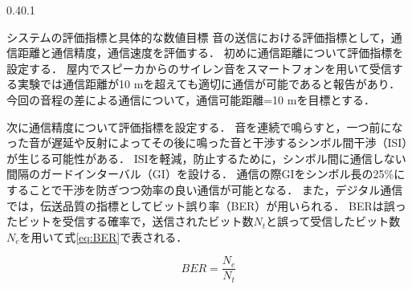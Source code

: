 \documentclass[a4j,11pt,dvipdfmx]{jsarticle}
\makeatletter
\renewcommand{\section}{%
    \@startsection{section}{1}{\z@}%
    {0.4\Cvs}{0.1\Cvs}%
    {\normalfont\headfont\raggedright}}
\makeatother
\begin{document}
\section{システムの評価指標と具体的な数値目標}\label{sec:evaluation}
音の送信における評価指標として，通信距離と通信精度，通信速度を評価する．
初めに通信距離について評価指標を設定する．
屋内でスピーカからのサイレン音をスマートフォンを用いて受信する実験では通信距離が10 mを超えても適切に通信が可能であると報告があり\cite{ref:tone}\cite{ref:tone2}．今回の音程の差による通信について，通信可能距離=10 mを目標とする．
\par
次に通信精度について評価指標を設定する．
音を連続で鳴らすと，一つ前になった音が遅延や反射によってその後に鳴った音と干渉するシンボル間干渉（ISI）が生じる可能性がある．
ISIを軽減，防止するために，シンボル間に通信しない間隔のガードインターバル（GI）を設ける．
通信の際GIをシンボル長の25\%にすることで干渉を防ぎつつ効率の良い通信が可能となる\cite{ref:GI}．
また，デジタル通信では，伝送品質の指標としてビット誤り率（BER）が用いられる\cite{ref:BER}．
BERは誤ったビットを受信する確率で，送信されたビット数$N_t$と誤って受信したビット数$N_e$を用いて式\ref{eq:BER}で表される．


\begin{equation}
  \label{eq:BER}
  BER = \frac{N_e}{N_t}
\end{equation}
\end{document}
